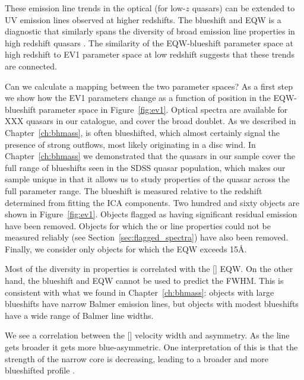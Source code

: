 These emission line trends in the optical (for low-$z$ quasars) can be extended to UV emission lines observed at higher redshifts. 
The  blueshift and \ac{EQW} is a diagnostic that similarly spans the diversity of broad emission line properties in high redshift quasars \citep[dominated by a virialized component at one extreme and a wind driven component at the other][]{richards11,sulentic07}. 
The similarity of the  \ac{EQW}-blueshift parameter space at high redshift to \ac{EV1} parameter space at low redshift suggests that these trends are connected. 

Can we calculate a mapping between the two parameter spaces? 
As a first step we show how the \ac{EV1} parameters change as a function of position in the  \ac{EQW}-blueshift parameter space in Figure~\ref{fig:ev1}.
Optical spectra are available for XXX quasars in our catalogue, and cover the broad  doublet. 
As we described in Chapter~\ref{ch:bhmass},  is often blueshifted, which almost certainly signal the presence of strong outflows, most likely originating in a disc wind.
In Chapter~\ref{ch:bhmass} we demonstrated that the quasars in our sample cover the full range of  blueshifts seen in the \ac{SDSS} quasar population, which makes our sample unique in that it allows us to study properties of the quasar across the full parameter range. 
The  blueshift is measured relative to the redshift determined from fitting the \ac{ICA} components.
Two hundred and sixty objects are shown in Figure~\ref{fig:ev1}.
Objects flagged as having significant  residual emission have been removed.  
Objects for which the \hb or  line properties could not be measured reliably (see Section~\ref{sec:flagged_spectra}) have also been removed. 
Finally, we consider only objects for which the  EQW exceeds 15\AA. 

Most of the diversity in  properties is correlated with the [] \ac{EQW}. 
On the other hand, the  blueshift and \ac{EQW} cannot be used to predict the \hb \ac{FWHM}. 
This is consistent with what we found in Chapter~\ref{ch:bhmass}: objects with large  blueshifts have narrow Balmer emission lines, but objects with modest  blueshifts have a wide range of Balmer line widths. 

We see a correlation between the [] velocity width and asymmetry. 
As the line gets broader it gets more blue-asymmetric. 
One interpretation of this is that the strength of the narrow core is decreasing, leading to a broader and more blueshifted profile \citep[e.g.][]{shen14}. 

